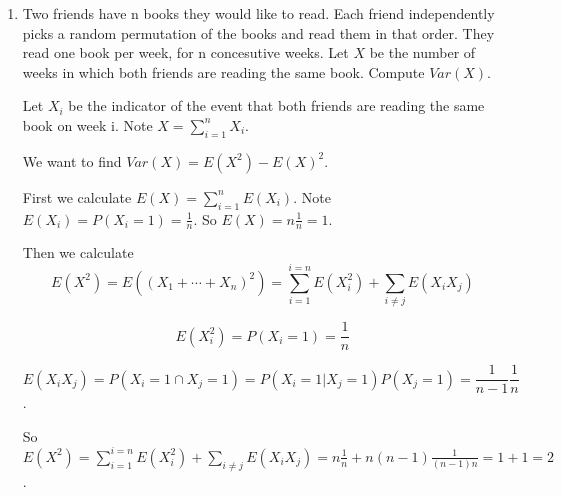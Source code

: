 \documentclass[11pt,preview]{standalone} %
\begin{document}
\begin{enumerate}
\begin{enumerate}
\item Compute $Var(X)$.
\begin{Freeform}{0.5}
\Solution $Var(X) = E(X^2) - E(X)^2$. We've calculated $E(X)^2$ in the last part and need $E(X^2)$.

$$E(X^2) = E((X_1 + \cdots + X_n)^2) = \sum_{i=1}^{i=n}E(X_i^2) + \sum_{i \neq j} E(X_iX_j)$$

$$E(X_i^2) = P(X_i = 1) = \frac{1}{2n}$$

$$E(X_iX_j) = P(X_i = 1 \cap X_j = 1) = P(X_i = 1 | X_j = 1) P(X_j = 1) = \frac{1}{2(n-1)} \frac{1}{2n}$$.

So $E(X^2) = \sum_{i=1}^{i=n}E(X_i^2) + \sum_{i \neq j} E(X_iX_j) = n \frac{1}{2n} + n(n-1) \frac{1}{2(n-1)} \frac{1}{2n} = \frac{1}{2} + \frac{1}{4} = \frac{3}{4}$.

Hence, $Var(X) = E(X^2) - E(X)^2 = \frac{3}{4} - \frac{1}{2^2} = \frac{1}{2}$.

\end{Freeform}

\end{enumerate}

\item Two friends have n books they would like to read. Each friend independently picks a random permutation of the books and read them in that order. They read one book per week, for n concesutive weeks. Let $X$ be the number of weeks in which both friends are reading the same book. Compute $Var(X)$.

\begin{Freeform}{1}
\Solution Let $X_i$ be the indicator of the event that both friends are reading the same book on week i. Note $X = \sum_{i=1}^{n} X_i$. 

We  want to find $Var(X) = E(X^2) - E(X)^2$. 

First we calculate $E(X) = \sum_{i=1}^nE(X_i)$. Note $E(X_i) = P(X_i = 1) = \frac{1}{n}$. So $E(X) = n \frac{1}{n} = 1$. 

Then we calculate $$E(X^2) = E((X_1 + \cdots + X_n)^2) = \sum_{i=1}^{i=n}E(X_i^2) + \sum_{i \neq j} E(X_iX_j)$$

$$E(X_i^2) = P(X_i = 1) = \frac{1}{n}$$

$$E(X_iX_j) = P(X_i = 1 \cap X_j = 1) = P(X_i = 1 | X_j = 1) P(X_j = 1) = \frac{1}{n-1} \frac{1}{n}$$.

So $E(X^2) = \sum_{i=1}^{i=n}E(X_i^2) + \sum_{i \neq j} E(X_iX_j) = n \frac{1}{n} + n(n-1) \frac{1}{(n-1)n} = 1 + 1 = 2$.



\end{Freeform}
\end{enumerate}
\end{document}
